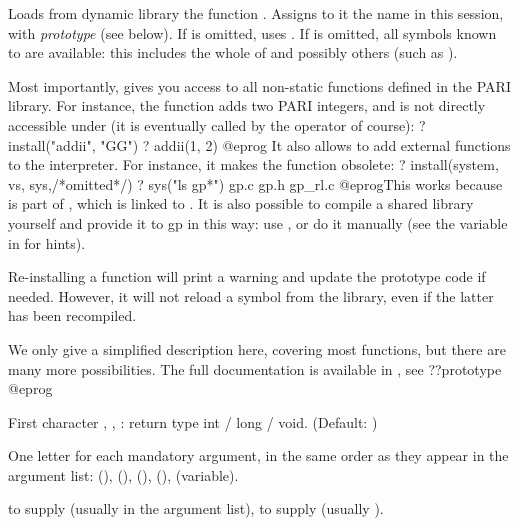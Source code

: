\label{se:install}
Loads from dynamic library  the function . Assigns to it
the name  in this  session, with \emph{prototype}
 (see below). If  is omitted, uses .
If  is omitted, all symbols known to  are available: this
includes the whole of  and possibly others (such as
).

Most importantly,  gives you access to all non-static functions
defined in the PARI library. For instance, the function  adds two PARI integers, and is not directly accessible under
 (it is eventually called by the \kbd{+} operator of course):
\bprog
? install("addii", "GG")
? addii(1, 2)
@eprog\noindent
It also allows to add external functions to the  interpreter.
For instance, it makes the function  obsolete:
\bprog
? install(system, vs, sys,/*omitted*/)
? sys("ls gp*")
gp.c            gp.h            gp_rl.c
@eprog\noindent This works because  is part of ,
which is linked to . It is also possible to compile a shared library
yourself and provide it to gp in this way: use , or do it manually
(see the  variable in  for hints).

Re-installing a function will print a warning and update the prototype code
if needed. However, it will not reload a symbol from the library, even if the
latter has been recompiled.

 We only give a simplified description here, covering
most functions, but there are many more possibilities. The full documentation
is available in , see
\bprog
  ??prototype
@eprog

\item First character , ,  : return type int / long /
void. (Default: )

\item One letter for each mandatory argument, in the same order as they appear
in the argument list:  (), \kbd{\&}
(),  (),  (), 
(variable).

 \item {} to supply  (usually  in the
 argument list),  to supply  (usually ).

